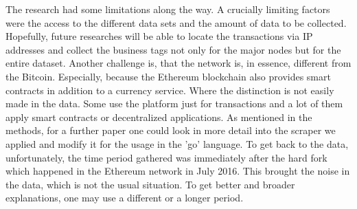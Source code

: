 The research had some limitations along the way.
A crucially limiting factors were the access to the different data sets and the amount of data to be collected.
Hopefully, future researches will be able to locate the transactions via IP addresses and collect the business tags not only for the major nodes but for the entire dataset.
Another challenge is, that the network is, in essence, different from the Bitcoin.
Especially, because the Ethereum blockchain also provides smart contracts in addition to a currency service.
Where the distinction is not easily made in the data.
Some use the platform just for transactions and a lot of them apply smart contracts or decentralized applications.
As mentioned in the methods, for a further paper one could look in more detail into the scraper we applied and modify it for the usage in the 'go' language.
% 
To get back to the data, unfortunately, the time period gathered was immediately after the hard fork which happened in the Ethereum network in July 2016.
This brought the noise in the data, which is not the usual situation.
To get better and broader explanations, one may use a different or a longer period.
